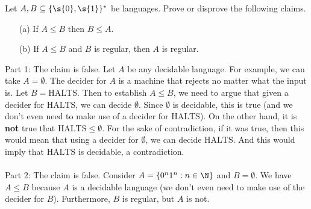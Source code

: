\begin{flex}
\begin{exercise} \label{exercise:Practice-with-reduction-definition}
Let $A, B \subseteq \{\s{0},\s{1}\}^*$ be languages. Prove or disprove the following claims.
\begin{enumerate}
    \item[(a)] If $A \leq B$ then $B \leq A$.
    \item[(b)] If $A \leq B$ and $B$ is regular, then $A$ is regular. 
\end{enumerate}
\end{exercise}

\begin{solution}
Part 1: The claim is false. Let $A$ be any decidable language. For example, we can take $A = \emptyset$. The decider for $A$ is a machine that rejects no matter what the input is. Let $B = \text{HALTS}$. Then to establish $A \leq B$, we need to argue that given a decider for $\text{HALTS}$, we can decide $\emptyset$. Since $\emptyset$ is decidable, this is true (and we don't even need to make use of a decider for $\text{HALTS}$). On the other hand, it is \textbf{not} true that $\text{HALTS} \leq \emptyset$. For the sake of contradiction, if it was true, then this would mean that using a decider for $\emptyset$, we can decide $\text{HALTS}$. And this would imply that $\text{HALTS}$ is decidable, a contradiction.
\\\\
\noindent
Part 2: The claim is false. Consider $A = \{0^n1^n: n \in \N\}$ and $B = \emptyset$. We have $A \leq B$ because $A$ is a decidable language (we don't even need to make use of the decider for $B$). Furthermore, $B$ is regular, but $A$ is not.
\end{solution}
\end{flex}


